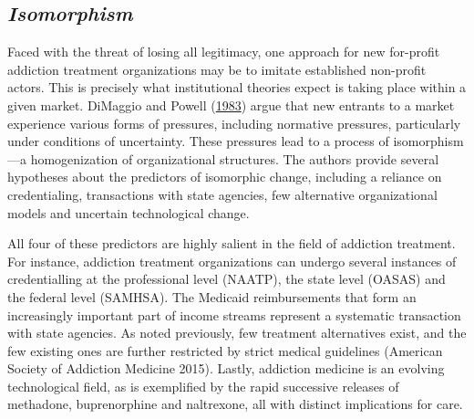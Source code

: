 \documentclass[
  12pt,
]{article}
\begin{document}
\hypertarget{isomorphism}{%
\subsection{\texorpdfstring{\emph{Isomorphism}}{Isomorphism}}\label{isomorphism}}

Faced with the threat of losing all legitimacy, one approach for new for-profit addiction treatment organizations may be to imitate established non-profit actors. This is precisely what institutional theories expect is taking place within a given market. DiMaggio and Powell (\protect\hyperlink{ref-dimaggio1983}{1983}) argue that new entrants to a market experience various forms of pressures, including normative pressures, particularly under conditions of uncertainty. These pressures lead to a process of isomorphism---a homogenization of organizational structures. The authors provide several hypotheses about the predictors of isomorphic change, including a reliance on credentialing, transactions with state agencies, few alternative organizational models and uncertain technological change.

\vspace{12pt}

All four of these predictors are highly salient in the field of addiction treatment. For instance, addiction treatment organizations can undergo several instances of credentialling at the professional level (NAATP), the state level (OASAS) and the federal level (SAMHSA). The Medicaid reimbursements that form an increasingly important part of income streams represent a systematic transaction with state agencies. As noted previously, few treatment alternatives exist, and the few existing ones are further restricted by strict medical guidelines (American Society of Addiction Medicine 2015). Lastly, addiction medicine is an evolving technological field, as is exemplified by the rapid successive releases of methadone, buprenorphine and naltrexone, all with distinct implications for care.

\vspace{12pt}
\end{document}
